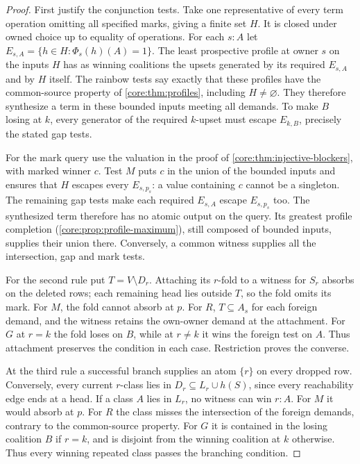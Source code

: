 \begin{proof}
First justify the conjunction tests. Take one representative of every
term operation omitting all specified marks, giving a finite set $H$.
It is closed under owned choice up to equality of operations. For each
$s:A$ let $E_{s,A}=\{h\in H:\Phi_s(h)(A)=1\}$. The least prospective
profile at owner $s$ on the inputs $H$ has as winning coalitions
the upsets generated by its required $E_{s,A}$ and by $H$ itself.
The rainbow tests say exactly that these profiles have the common-source
property of \cref{core:thm:profiles}, including $H\ne\varnothing$.
They therefore synthesize a term in these bounded inputs meeting all
demands. To make $B$ losing at $k$, every generator of the required
$k$-upset must escape $E_{k,B}$, precisely the stated gap tests.

For the mark query use the valuation in the proof of
\cref{core:thm:injective-blockers}, with marked winner $c$.
Test $M$ puts $c$ in the union of the bounded inputs and ensures that $H$
escapes every $E_{s,p_s}$: a value containing $c$ cannot be a singleton.
The remaining gap tests make
each required $E_{s,A}$ escape $E_{s,p_s}$ too. The synthesized term
therefore has no atomic output on the query. Its greatest profile
completion (\cref{core:prop:profile-maximum}), still composed of
bounded inputs, supplies their union there. Conversely, a common
witness supplies all the intersection, gap and mark tests.

For the second rule put $T=V\setminus D_r$. Attaching its $r$-fold
to a witness for $S_r$ absorbs on the deleted rows; each remaining
head lies outside $T$, so the fold omits its mark. For $M$, the fold
cannot absorb at $p$. For $R$, $T\subseteq A_s$ for each foreign
demand, and the witness retains the own-owner demand at the attachment.
For $G$ at $r=k$ the fold loses on $B$, while at $r\ne k$ it wins
the foreign test on $A$. Thus attachment preserves the condition in
each case. Restriction proves the converse.

At the third rule a successful branch supplies an atom $\{r\}$ on every
dropped row. Conversely, every current $r$-class lies in
$D_r\subseteq L_r\cup h(S)$, since every reachability edge ends at a head.
If a class $A$ lies in $L_r$, no witness can win $r:A$. For $M$ it
would absorb at $p$. For $R$ the class misses the intersection of the
foreign demands, contrary to the common-source property. For $G$ it
is contained in the losing coalition $B$ if $r=k$, and is disjoint
from the winning coalition at $k$ otherwise. Thus every winning repeated
class passes the branching condition.


\end{proof}
